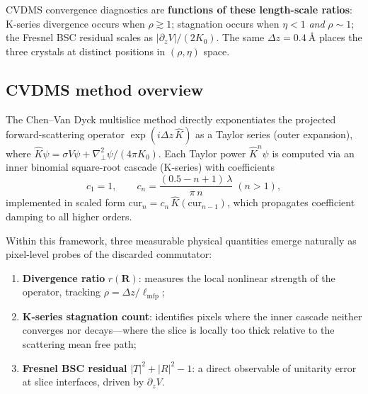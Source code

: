 \documentclass[twoside,11pt]{article}
\begin{document}
CVDMS convergence diagnostics are \textbf{functions of these length-scale ratios}: K-series divergence occurs when $\rho\gtrsim1$; stagnation occurs when $\eta<1$ \textit{and} $\rho\sim1$; the Fresnel BSC residual scales as $|\partial_z V|/(2K_0)$. The same $\Delta z=\SI{0.4}{\angstrom}$ places the three crystals at distinct positions in $(\rho,\eta)$ space.

\subsection{CVDMS method overview}

The Chen--Van Dyck multislice method directly exponentiates the projected forward-scattering operator $\exp(i\Delta z\,\hat{K})$ as a Taylor series (outer expansion), where $\hat{K}\psi=\sigma V\psi+\nabla_\perp^2\psi/(4\pi K_0)$. Each Taylor power $\hat{K}^n\psi$ is computed via an inner binomial square-root cascade (K-series) with coefficients
\begin{equation}\label{eq:coeffs}
c_1=1,\qquad c_n=\frac{(0.5-n+1)\,\lambda}{\pi\,n}\;(n>1),
\end{equation}
implemented in scaled form $\text{cur}_n=c_n\,\hat{K}(\text{cur}_{n-1})$, which propagates coefficient damping to all higher orders.

Within this framework, three measurable physical quantities emerge naturally as pixel-level probes of the discarded commutator:
\begin{enumerate}[nosep]
\item \textbf{Divergence ratio} $r(\mathbf{R})$: measures the local nonlinear strength of the operator, tracking $\rho=\Delta z/\ell_\text{mfp}$;
\item \textbf{K-series stagnation count}: identifies pixels where the inner cascade neither converges nor decays---where the slice is locally too thick relative to the scattering mean free path;
\item \textbf{Fresnel BSC residual} $|T|^2+|R|^2-1$: a direct observable of unitarity error at slice interfaces, driven by $\partial_z V$.
\end{enumerate}
\end{document}
